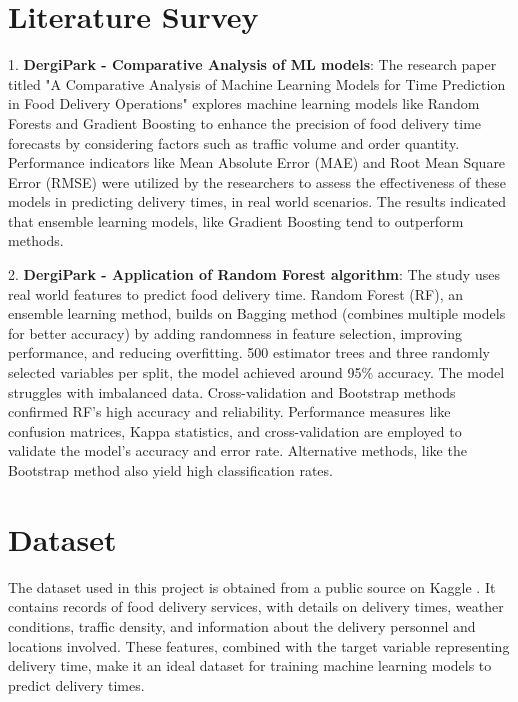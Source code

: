 \documentclass[10pt,twocolumn,letterpaper]{article}
\begin{document}
\section{Literature Survey}
1. \textbf{DergiPark - Comparative Analysis of ML models}: The research paper titled "A Comparative Analysis of Machine Learning Models for Time Prediction in Food Delivery Operations" explores machine learning models like Random Forests and Gradient Boosting to enhance the precision of food delivery time forecasts by considering factors such as traffic volume and order quantity. Performance indicators like Mean Absolute Error (MAE) and Root Mean Square Error (RMSE) were utilized by the researchers to assess the effectiveness of these models in predicting delivery times, in real world scenarios. The results indicated that ensemble learning models, like Gradient Boosting tend to outperform methods. \cite{dergipark1}

2. \textbf{DergiPark - Application of Random Forest algorithm}: The study uses real world features to predict food delivery time. Random Forest (RF), an ensemble learning method, builds on Bagging method (combines multiple models for better accuracy) by adding randomness in feature selection, improving performance, and reducing overfitting. 500 estimator trees and three randomly selected variables per split, the model achieved around 95\% accuracy. The model struggles with imbalanced data. Cross-validation and Bootstrap methods confirmed RF's high accuracy and reliability. Performance measures like confusion matrices, Kappa statistics, and cross-validation are employed to validate the model’s accuracy and error rate. Alternative methods, like the Bootstrap method also yield high classification rates. \cite{dergipark2}

\section{Dataset}
    The dataset used in this project is obtained from a public source on Kaggle \cite{kaggle}. It contains records of food delivery services, with details on delivery times, weather conditions, traffic density, and information about the delivery personnel and locations involved. These features, combined with the target variable representing delivery time, make it an ideal dataset for training machine learning models to predict delivery times.
\end{document}

